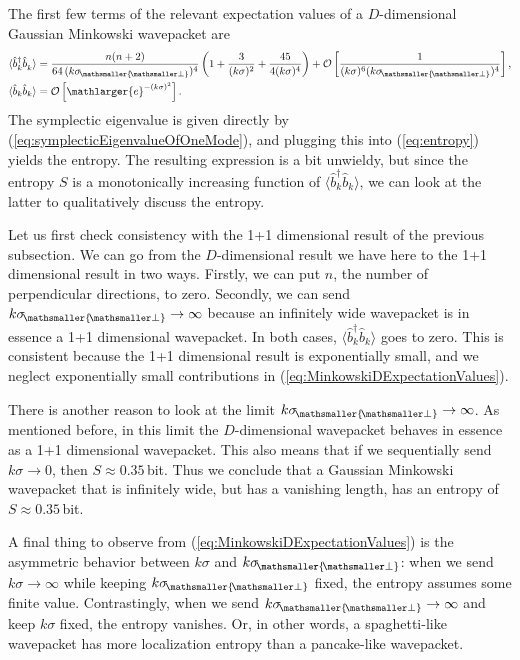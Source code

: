 \documentclass[11pt, a4paper]{article}
\newcommand{\si}{{\sigma}}
\newcommand{\nn}{\nonumber}
\let\perptmp\perp
\renewcommand{\perp}{{\! \mathsmaller{\perptmp}}}
\newcommand{\e}{\mathlarger{e}}
\newcommand{\nodagger}{{\phantom{\dagger}}}
\begin{document}
The first few terms of the relevant expectation values of a $D$-dimensional Gaussian Minkowski wavepacket are
\begin{align}
\label{eq:MinkowskiDExpectationValues}
	\langle \hat b_k^\dagger \hat b^\nodagger_k \rangle &= \frac{n(n+2)}{64\,( k  \si_\perp)^4}\left(1+\frac{3}{( k  \si )^2}+\frac{45}{4( k  \si )^4}\right)+\mathcal O \left[\frac{1}{( k \si )^6( k \si_\perp)^4}\right],\\
\langle \hat b_k \hat b_k \rangle  & = \mathcal O\left[\e^{-( k \si )^2}\right].\nn
\end{align}
The symplectic eigenvalue is given directly by (\ref{eq:symplecticEigenvalueOfOneMode}), and plugging this into (\ref{eq:entropy}) yields the entropy. The resulting expression is a bit unwieldy, but since the entropy $S$ is a monotonically increasing function of $\langle \hat b_k^\dagger \hat b^\nodagger_k \rangle$, we can look at the latter to qualitatively discuss the entropy. 

Let us first check consistency with the 1+1 dimensional result of the previous subsection. We can go from the $D$-dimensional result  we have here to the 1+1 dimensional result in two ways. Firstly, we can put $n$, the number of perpendicular directions, to zero. Secondly, we can send $k\si_\perp\to\infty$ because an infinitely wide wavepacket is in essence a 1+1 dimensional wavepacket. In both cases, $\langle \hat b_k^\dagger \hat b^\nodagger_k \rangle$ goes to zero. This is consistent because the 1+1 dimensional result is exponentially small, and we neglect exponentially small contributions in (\ref{eq:MinkowskiDExpectationValues}).

There is another reason to look at the limit $k\si_\perp\to\infty$. As mentioned before, in this limit the $D$-dimensional wavepacket behaves in essence as a 1+1 dimensional wavepacket. This also means that if we sequentially send $k\si\to 0$, then $S\approx 0.35\,$bit. Thus we conclude that a Gaussian Minkowski wavepacket that is infinitely wide, but has a vanishing length, has an entropy of $S\approx 0.35\,$bit. 

A final thing to observe from (\ref{eq:MinkowskiDExpectationValues}) is the asymmetric behavior between $k\si$ and $k\si_\perp$: when we send $k\si\to\infty$ while keeping $k\si_\perp$ fixed, the entropy assumes some finite value. Contrastingly, when we send $k\si_\perp\to\infty$ and keep $k\si$ fixed, the entropy vanishes. Or, in other words, a spaghetti-like wavepacket has more localization entropy than a pancake-like wavepacket. 
\end{document}
